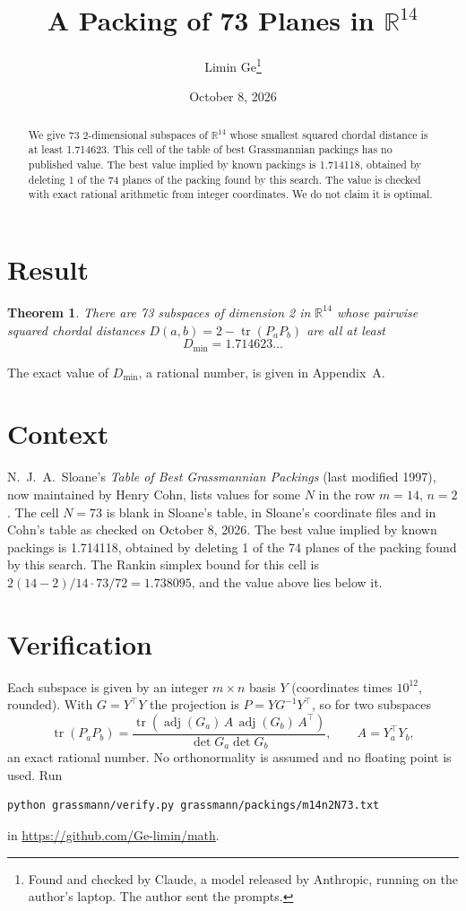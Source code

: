 \documentclass[11pt,a4paper]{article}
\title{A Packing of 73 Planes in $\mathbb{R}^{14}$}
\author{Limin Ge\thanks{Found and checked by Claude, a model released by Anthropic, running on the author's laptop. The author sent the prompts.}}
\date{October 8, 2026}
\newtheorem*{theorem}{Theorem}
\begin{document}
\maketitle
\begin{abstract}
We give 73 2-dimensional subspaces of $\mathbb{R}^{14}$ whose smallest squared chordal distance is at least 1.714623. This cell of the table of best Grassmannian packings has no published value. The best value implied by known packings is 1.714118, obtained by deleting 1 of the 74 planes of the packing found by this search. The value is checked with exact rational arithmetic from integer coordinates. We do not claim it is optimal.
\end{abstract}

\section{Result}
\begin{theorem}
There are 73 subspaces of dimension 2 in $\mathbb{R}^{14}$ whose pairwise squared chordal distances $D(a,b) = 2 - \operatorname{tr}(P_aP_b)$ are all at least
\[ D_{\min} = 1.714623\ldots \]
\end{theorem}
The exact value of $D_{\min}$, a rational number, is given in Appendix~A.


\section{Context}
N.~J.~A.~Sloane's \emph{Table of Best Grassmannian Packings} (last modified 1997), now maintained by Henry Cohn, lists values for some $N$ in the row $m=14$, $n=2$. The cell $N=73$ is blank in Sloane's table, in Sloane's coordinate files and in Cohn's table as checked on October 8, 2026. The best value implied by known packings is 1.714118, obtained by deleting 1 of the 74 planes of the packing found by this search. The Rankin simplex bound for this cell is $2(14-2)/14\cdot 73/72 = 1.738095$, and the value above lies below it.


\section{Verification}
Each subspace is given by an integer $m\times n$ basis $Y$ (coordinates times $10^{12}$, rounded). With $G=Y^\top Y$ the projection is $P=YG^{-1}Y^\top$, so for two subspaces
\[ \operatorname{tr}(P_aP_b)=\frac{\operatorname{tr}(\operatorname{adj}(G_a)\,A\,\operatorname{adj}(G_b)\,A^\top)}{\det G_a\det G_b},\qquad A=Y_a^\top Y_b, \]
an exact rational number. No orthonormality is assumed and no floating point is used. Run
\begin{verbatim}
python grassmann/verify.py grassmann/packings/m14n2N73.txt
\end{verbatim}
in \url{https://github.com/Ge-limin/math}.
\end{document}
